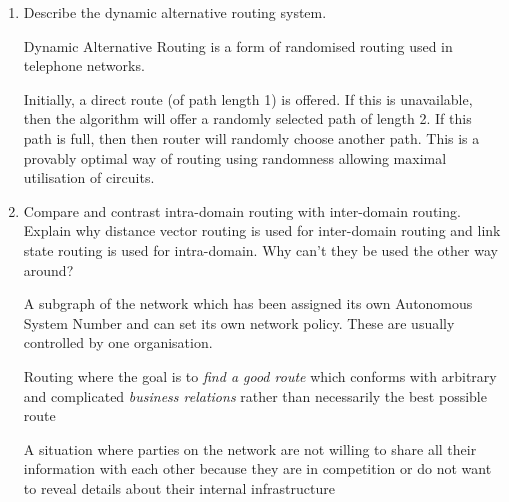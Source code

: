 \documentclass[10pt,\jkfside,a4paper]{article}
\begin{document}
\begin{enumerate}

    \item Describe the dynamic alternative routing system.

    Dynamic Alternative Routing is a form of randomised routing used in telephone networks.

    Initially, a direct route (\ie of path length 1) is offered. If this is unavailable, then the algorithm will offer a randomly selected path of length 2. If this path is full, then then router will randomly
    choose another path. This is a provably optimal way of routing using randomness allowing maximal utilisation of circuits.

    \item Compare and contrast intra-domain routing with inter-domain routing. Explain why distance vector routing is used for inter-domain routing and link state routing is used for intra-domain. Why can't they
    be used the other way around?

    \begin{definition}

        A subgraph of the network which has been assigned its own Autonomous System Number and can set its own network policy. These are usually controlled by one organisation.

    \end{definition}

    \begin{definition}

        Routing where the goal is to \textit{find a good route} which conforms with arbitrary and complicated \textit{business relations} rather than necessarily the best possible route

    \end{definition}

    \begin{definition}

        A situation where parties on the network are not willing to share all their information with each other because \ie they are in competition or do not want to reveal details about their internal
        infrastructure \etc

    \end{definition}

    \begin{table}[h]

        \centering


\end{table}
\end{enumerate}
\end{document}
